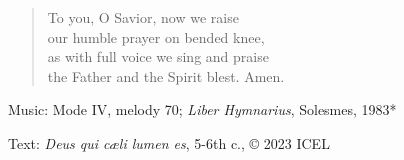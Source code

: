 \hymn



\setlength{\leftmargini}{2em}
\begin{verse}
To you, O Savior, now we raise\\
our humble prayer on bended knee,\\
as with full voice we sing and praise\\
the Father and the Spirit blest. Amen.
\end{verse}
\setlength{\leftmargini}{\defleftmargini}

\begin{hymnsource}
Music: Mode IV, melody 70; \emph{Liber Hymnarius}, Solesmes, 1983*

Text: \emph{Deus qui cæli lumen es}, 5-6th c., © 2023 ICEL
\end{hymnsource}

